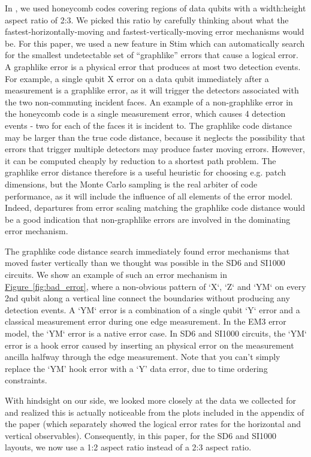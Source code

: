 \documentclass[onecolumn,unpublished,a4paper]{quantumarticle}
\theoremstyle{definition}
\theoremstyle{definition}
\theoremstyle{definition}
\newcommand{\fig}[1]{\hyperref[fig:#1]{Figure~\ref*{fig:#1}}}
\begin{document}
In \cite{gidney2021honeycombmemory}, we used honeycomb codes covering regions of data qubits with a width:height aspect ratio of 2:3.
We picked this ratio by carefully thinking about what the fastest-horizontally-moving and fastest-vertically-moving error mechanisms would be.
For this paper, we used a new feature in Stim which can automatically search for the smallest undetectable set of ``graphlike'' errors that cause a logical error.
A graphlike error is a physical error that produces at most two detection events.
For example, a single qubit X error on a data qubit immediately after a measurement is a graphlike error, as it will trigger the detectors associated with the two non-commuting incident faces. An example of a non-graphlike error in the honeycomb code is a single measurement error, which causes 4 detection events - two for each of the faces it is incident to.  
The graphlike code distance may be larger than the true code distance, because it neglects the possibility that errors that trigger multiple detectors may produce faster moving errors. However, it can be computed cheaply by reduction to a shortest path problem. The graphlike error distance therefore is a useful heuristic for choosing e.g. patch dimensions, but the Monte Carlo sampling is the real arbiter of code performance, as it will include the influence of all elements of the error model. Indeed, departures from error scaling matching the graphlike code distance would be a good indication that non-graphlike errors are involved in the dominating error mechanism.

The graphlike code distance search immediately found error mechanisms that moved faster vertically than we thought was possible in the SD6 and SI1000 circuits. We show an example of such an error mechanism in \fig{bad_error}, where a non-obvious pattern of `X`, `Z` and `YM` on every 2nd qubit along a vertical line connect the boundaries without producing any detection events. A `YM` error is a combination of a single qubit `Y` error and a classical measurement error during one edge measurement. In the EM3 error model, the `YM` error is a native error case. In SD6 and SI1000 circuits, the `YM` error is a hook error caused by inserting an physical error on the measurement ancilla halfway through the edge measurement. 
Note that you can't simply replace the `YM' hook error with a `Y' data error, due to time ordering constraints.

With hindsight on our side, we looked more closely at the data we collected for \cite{gidney2021honeycombmemory} and realized this is actually noticeable from the plots included in the appendix of the paper (which separately showed the logical error rates for the horizontal and vertical observables).
Consequently, in this paper, for the SD6 and SI1000 layouts, we now use a 1:2 aspect ratio instead of a 2:3 aspect ratio.
\end{document}
